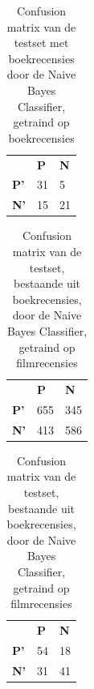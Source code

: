 \begin{table}
\centering
\begin{tabular}{lll}
                                 & \textbf{P}               & \textbf{N}            \\ \cline{2-3} 
\multicolumn{1}{l|}{\textbf{P'}} & \multicolumn{1}{l|}{31} & \multicolumn{1}{l|}{5} \\ \cline{2-3} 
\multicolumn{1}{l|}{\textbf{N'}} & \multicolumn{1}{l|}{15} & \multicolumn{1}{l|}{21} \\ \cline{2-3} 
\end{tabular}
\caption{Confusion matrix van de testset met boekrecensies door de  Naive Bayes Classifier, getraind op boekrecensies} 
\end{table}
 

\begin{table}
\centering
\setlength\tabcolsep{4pt}
\begin{minipage}[t]{0.48\textwidth}
\centering
\begin{tabular}{lll}
                                 & \textbf{P}               & \textbf{N}               \\ \cline{2-3} 
\multicolumn{1}{l|}{\textbf{P'}} & \multicolumn{1}{l|}{655} & \multicolumn{1}{l|}{345} \\ \cline{2-3} 
\multicolumn{1}{l|}{\textbf{N'}} & \multicolumn{1}{l|}{413} & \multicolumn{1}{l|}{586} \\ \cline{2-3} 
\end{tabular}
\caption{Confusion matrix van de testset ,bestaande uit muziekrecensies, door de  Naive Bayes Classifier, getraind op filmrecensies}
\end{minipage}%
\hfill
\begin{minipage}[t]{0.48\textwidth}
\centering
\begin{tabular}{lll}
                                 & \textbf{P}               & \textbf{N}               \\ \cline{2-3} 
\multicolumn{1}{l|}{\textbf{P'}} & \multicolumn{1}{l|}{54} & \multicolumn{1}{l|}{18} \\ \cline{2-3} 
\multicolumn{1}{l|}{\textbf{N'}} & \multicolumn{1}{l|}{31} & \multicolumn{1}{l|}{41} \\ \cline{2-3} 
\end{tabular}
\caption{Confusion matrix van de testset, bestaande uit boekrecensies, door de  Naive Bayes Classifier, getraind op filmrecensies} 
\end{minipage}
\end{table}


